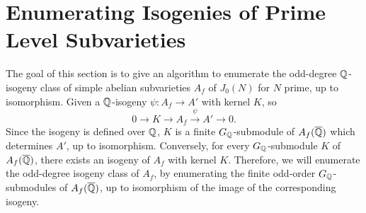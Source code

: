 \documentclass{article}
\begin{document}
    
\section{Enumerating Isogenies of Prime Level Subvarieties}

The goal of this section is to give an algorithm to enumerate the odd-degree
$\mathbb{Q}$-isogeny class of simple abelian subvarieties $A_f$ of $J_0(N)$ for $N$
prime, up to isomorphism. Given a $\mathbb{Q}$-isogeny $\psi:A_f\to A'$ with kernel
$K$, so
\[
    0 \to K \to A_f \overset{\psi}{\to} A' \to 0.
\]
Since the isogeny is defined over $\mathbb{Q}$, $K$ is a finite $G_{\mathbb{Q}}$-submodule of
$A_f(\overline{\mathbb{Q}})$ which determines $A'$, up to isomorphism. Conversely, for every
$G_{\mathbb{Q}}$-submodule $K$ of $A_f(\overline{\mathbb{Q}})$, there exists an isogeny of $A_f$ with
kernel $K$. Therefore, we will enumerate the odd-degree isogeny class of $A_f$,
by enumerating the finite odd-order $G_{\mathbb{Q}}$-submodules of $A_f(\overline{\mathbb{Q}})$, up to
isomorphism of the image of the corresponding isogeny. 
\end{document}
